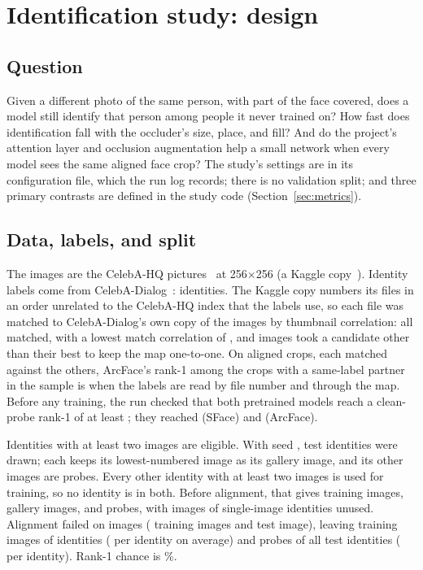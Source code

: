 \section{Identification study: design}\label{sec:design}

\subsection{Question}

Given a different photo of the same person, with part of the face covered, does a model still identify that person among  people it never trained on? How fast does identification fall with the occluder's size, place, and fill? And do the project's attention layer and occlusion augmentation help a small network when every model sees the same aligned face crop? The study's settings are in its configuration file, which the run log records; there is no validation split; and three primary contrasts are defined in the study code (Section~\ref{sec:metrics}).

\subsection{Data, labels, and split}

The images are the  CelebA-HQ pictures~\cite{karras2018pggan,liu2015celeba} at 256$\times$256 (a Kaggle copy~\cite{kagglecelebahq}). Identity labels come from CelebA-Dialog~\cite{jiang2021talk,lee2020maskgan}:  identities. The Kaggle copy numbers its files in an order unrelated to the CelebA-HQ index that the labels use, so each file was matched to CelebA-Dialog's own copy of the images by thumbnail correlation: all  matched, with a lowest match correlation of , and  images took a candidate other than their best to keep the map one-to-one. On  aligned crops, each matched against the others, ArcFace's rank-1 among the crops with a same-label partner in the sample is  when the labels are read by file number and  through the map. Before any training, the run checked that both pretrained models reach a clean-probe rank-1 of at least ; they reached  (SFace) and  (ArcFace).

Identities with at least two images are eligible. With seed ,  test identities were drawn; each keeps its lowest-numbered image as its gallery image, and its other images are probes. Every other identity with at least two images is used for training, so no identity is in both. Before alignment, that gives  training images,  gallery images, and  probes, with  images of single-image identities unused. Alignment failed on  images ( training images and  test image), leaving  training images of  identities ( per identity on average) and  probes of all  test identities ( per identity). Rank-1 chance is \%.


